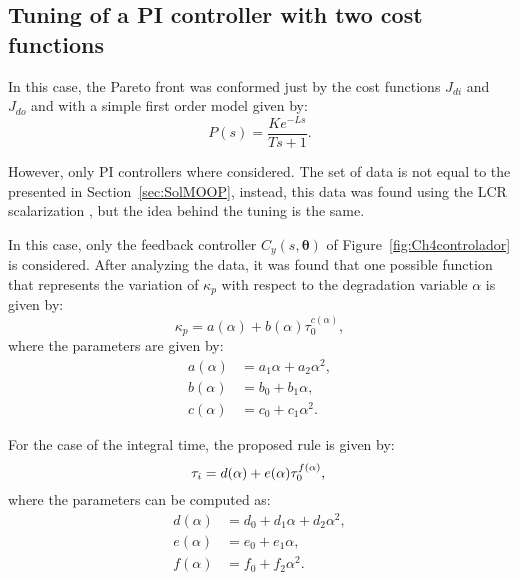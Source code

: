 \subsection{Tuning of a PI controller with two cost functions}
\label{sec:PI2FunMonica}
In this case, the Pareto front was conformed just by the cost functions $J_{di}$ and $J_{do}$ and with a simple first order model given by:
\begin{equation}
	P(s) = \frac{K e^{-Ls}}{Ts+1}.
\end{equation}

However, only PI controllers where considered. The set of data is not equal to the presented in Section~\ref{sec:SolMOOP}, instead, this data was found using the LCR scalarization \citet{Rojas2015b}, but the idea behind the tuning is the same.

In this case, only the feedback controller $C_y(s,\bm{\theta})$ of Figure~\ref{fig:Ch4controlador} is considered. After analyzing the data, it was found that one possible function that represents the variation of $\kappa_p$ with respect to the degradation variable $\alpha$ is given by:
\begin{equation}  %
\kappa_p = a(\alpha) +b(\alpha)\tau_0^{c(\alpha)},
\label{ec:KpMonica}
\end{equation}
%
where the parameters are given by:
\begin{align*}
%
a(\alpha) &=  a_1 \alpha + a_2 \alpha^2,\\%
%
b(\alpha) &=  b_0  + b_1 \alpha,\\%
%
c(\alpha) &=  c_0  + c_1 \alpha^2.%
\end{align*}

For the case of the integral time, the proposed rule is given by:
\begin{equation}  %
\tau_i = d(\alpha) +e(\alpha)\tau_0^{f(\alpha)},	\label{ec:TiMonica}\\
\end{equation}
%
where the parameters can be computed as:
\begin{align*}  %
d(\alpha) &= d_0 + d_1 \alpha + d_2 \alpha^2,\\
%
e(\alpha) &= e_0 + e_1 \alpha,\\
%
f(\alpha) &= f_0 + f_2 \alpha^2.\\
\end{align*}

